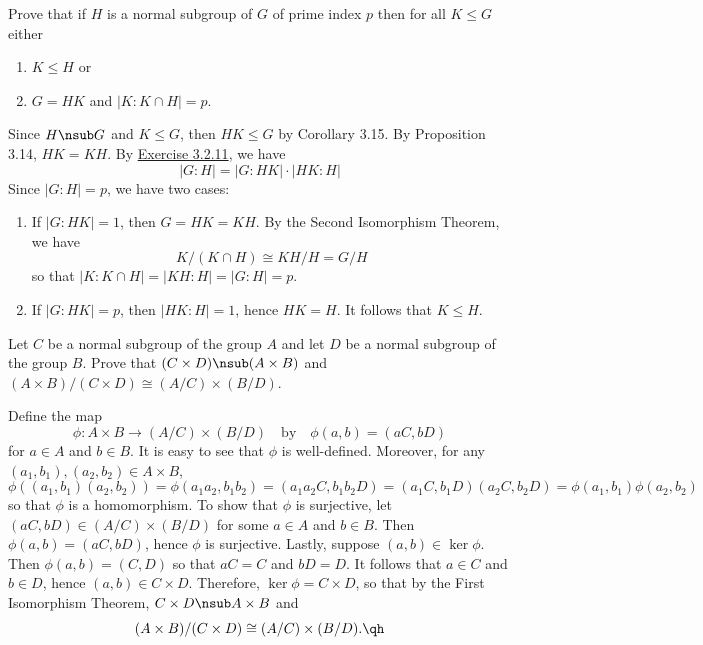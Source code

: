\begin{exercise}\label{ex3.3.3}
    Prove that if $H$ is a normal subgroup of $G$ of prime index $p$ then for all $K \leq G$ either
    \begin{enumerate}
        \item[(i)] $K \leq H$ or
        \item[(ii)] $G = HK$ and $|K : K \cap H| = p$.
    \end{enumerate}
\end{exercise}

\begin{sol}
    Since $H \nsub G$ and $K \leq G$, then $HK \leq G$ by Corollary 3.15. By Proposition 3.14, $HK = KH$. By \hyperref[ex3.2.11]{Exercise 3.2.11}, we have
    \[|G : H| = |G : HK| \cdot |HK : H|\]
    Since $|G : H| = p$, we have two cases:
    \begin{enumerate}
        \item If $|G : HK| = 1$, then $G = HK = KH$. By the Second Isomorphism Theorem, we have
        \[K/(K \cap H) \cong KH/H = G/H\]
        so that $|K : K \cap H| = |KH : H| = |G : H| = p$.
        \item If $|G : HK| = p$, then $|HK : H| = 1$, hence $HK = H$. It follows that $K \leq H$. \qh
    \end{enumerate}
\end{sol}

\begin{exercise}\label{ex3.3.4}
    Let $C$ be a normal subgroup of the group $A$ and let $D$ be a normal subgroup of the group $B$. Prove that $(C \times D) \nsub (A \times B)$ and $(A \times B)/(C \times D) \cong (A/C) \times (B/D)$.
\end{exercise}

\begin{sol}
    Define the map
    \[\phi : A \times B \to (A/C) \times (B/D) \quad \text{by} \quad \phi(a, b) = (aC, bD)\]
    for $a \in A$ and $b \in B$. It is easy to see that $\phi$ is well-defined. Moreover, for any $(a_1, b_1), (a_2, b_2) \in A \times B$,
    \[\phi((a_1, b_1)(a_2, b_2)) = \phi(a_1a_2, b_1b_2) = (a_1a_2C, b_1b_2D) = (a_1C, b_1D)(a_2C, b_2D) = \phi(a_1, b_1) \phi(a_2, b_2)\]
    so that $\phi$ is a homomorphism. To show that $\phi$ is surjective, let $(aC, bD) \in (A/C) \times (B/D)$ for some $a \in A$ and $b \in B$. Then $\phi(a, b) = (aC, bD)$, hence $\phi$ is surjective. Lastly, suppose $(a, b) \in \ker\phi$. Then $\phi(a, b) = (C, D)$ so that $aC = C$ and $bD = D$. It follows that $a \in C$ and $b \in D$, hence $(a, b) \in C \times D$. Therefore, $\ker\phi = C \times D$, so that by the First Isomorphism Theorem, $C \times D \nsub A \times B$ and
    \[(A \times B)/(C \times D) \cong (A/C) \times (B/D). \qh\]
\end{sol}


